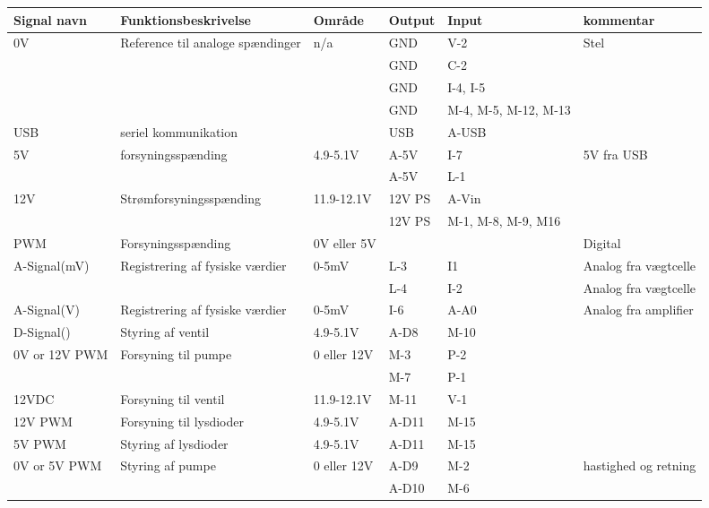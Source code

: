 \begin{center}
		\begin{longtable}{ | m{2cm} | m{4.750cm}| m{2cm}| m{1.125cm}| m{1.125cm}| m{3.5cm}| } 
			\hline
			\textbf{Signal navn} &\textbf{Funktionsbeskrivelse} &\textbf{Område} & \textbf{Output} & \textbf{Input} &\textbf{kommentar}\\ 
			\hline
			\multirow{2}{*}{0V} & \multirow{4}{*}{Reference til analoge spændinger} & n/a & GND & V-2  & Stel \\ 
& & & GND & C-2 &   \\
& & & GND & I-4, I-5 &   \\
& & & GND & M-4, M-5, M-12, M-13 &   \\
			\hline	
			USB &  seriel kommunikation & & USB & A-USB &  \\ 
			\hline	
			5V & \multirow{2}{*}{forsyningsspænding} & 4.9-5.1V & A-5V & I-7 & 5V fra USB  \\ 
& & & A-5V & L-1 & \\
			\hline
			12V & \multirow{2}{*}{Strømforsyningsspænding} & 11.9-12.1V & 12V PS & A-Vin & \\
			& & & 12V PS & M-1, M-8, M-9, M16 &   \\ 
			\hline
			PWM & Forsyningsspænding & 0V eller 5V & &  & Digital \\ 
			\hline	
			A-Signal(mV) &\multirow{2}{*}{Registrering af fysiske værdier}  & 0-5mV & L-3 & I1 & Analog fra vægtcelle \\ 
			& & & L-4 & I-2 &  Analog fra vægtcelle \\
			\hline
			A-Signal(V) & Registrering af fysiske værdier & 0-5mV & I-6 & A-A0 & Analog fra amplifier\\ 
			\hline
			D-Signal() & Styring af ventil & 4.9-5.1V & A-D8 &M-10 & \\ 
			\hline
			0V or 12V PWM & \multirow{2}{*}{Forsyning til pumpe} & 0 eller 12V & M-3 & P-2 & \\
			& & & M-7 & P-1 & \\
			\hline	
			12VDC & Forsyning til ventil & 11.9-12.1V & M-11 & V-1 &  \\
			\hline
			12V PWM & Forsyning til lysdioder & 4.9-5.1V & A-D11 & M-15 &  \\
			\hline
			5V PWM & Styring af lysdioder & 4.9-5.1V & A-D11 & M-15 &  \\
			\hline
			0V or 5V PWM & \multirow{2}{*}{Styring af pumpe} & 0 eller 12V & A-D9 & M-2 & hastighed og retning\\
			& & & A-D10 & M-6 & \\
			\hline
		\end{longtable}
	\end{center}



